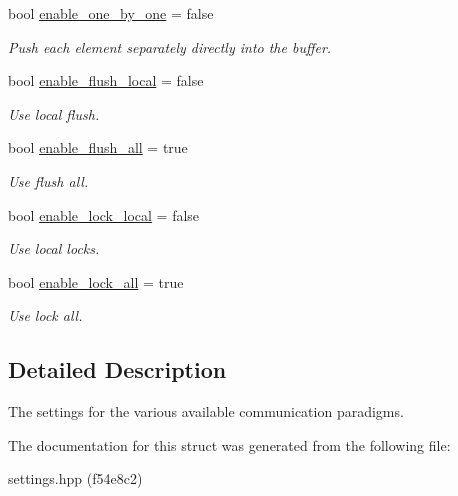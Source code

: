 \begin{DoxyCompactItemize}
bool \hyperlink{structSchwarzWrappers_1_1Settings_1_1comm__settings_a94a65410d1c436a47dbb116b5d3d5af1}{enable\+\_\+one\+\_\+by\+\_\+one} = false
\begin{DoxyCompactList}\small\item\em Push each element separately directly into the buffer. \end{DoxyCompactList}\item 
\mbox{\label{structSchwarzWrappers_1_1Settings_1_1comm__settings_a70c60458477096cecd87a53139ee61e8}} 
bool \hyperlink{structSchwarzWrappers_1_1Settings_1_1comm__settings_a70c60458477096cecd87a53139ee61e8}{enable\+\_\+flush\+\_\+local} = false
\begin{DoxyCompactList}\small\item\em Use local flush. \end{DoxyCompactList}\item 
\mbox{\label{structSchwarzWrappers_1_1Settings_1_1comm__settings_a147d1ec7e1eaa5bea9e640d0bb6a7636}} 
bool \hyperlink{structSchwarzWrappers_1_1Settings_1_1comm__settings_a147d1ec7e1eaa5bea9e640d0bb6a7636}{enable\+\_\+flush\+\_\+all} = true
\begin{DoxyCompactList}\small\item\em Use flush all. \end{DoxyCompactList}\item 
\mbox{\label{structSchwarzWrappers_1_1Settings_1_1comm__settings_aef1f78be36243e63b9ef7c04dee35f1b}} 
bool \hyperlink{structSchwarzWrappers_1_1Settings_1_1comm__settings_aef1f78be36243e63b9ef7c04dee35f1b}{enable\+\_\+lock\+\_\+local} = false
\begin{DoxyCompactList}\small\item\em Use local locks. \end{DoxyCompactList}\item 
\mbox{\label{structSchwarzWrappers_1_1Settings_1_1comm__settings_a9158358e7f737ae5769c5c51730dee7b}} 
bool \hyperlink{structSchwarzWrappers_1_1Settings_1_1comm__settings_a9158358e7f737ae5769c5c51730dee7b}{enable\+\_\+lock\+\_\+all} = true
\begin{DoxyCompactList}\small\item\em Use lock all. \end{DoxyCompactList}\end{DoxyCompactItemize}


\subsection{Detailed Description}
The settings for the various available communication paradigms. 

The documentation for this struct was generated from the following file\+:\begin{DoxyCompactItemize}
\item 
settings.\+hpp (f54e8c2)\end{DoxyCompactItemize}
